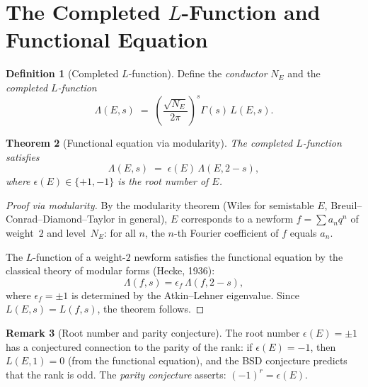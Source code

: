 \documentclass[12pt,a4paper]{amsart}
\newtheorem{theorem}{Theorem}[section]
\theoremstyle{definition}
\newtheorem{definition}[theorem]{Definition}
\newtheorem{remark}[theorem]{Remark}
\begin{document}
\section{The Completed \texorpdfstring{$L$}{L}-Function and Functional Equation}

\begin{definition}[Completed $L$-function]
\label{def:completed_L}
Define the \emph{conductor} $N_E$ and the \emph{completed $L$-function}
\[
  \Lambda(E,s) \;=\; \left(\frac{\sqrt{N_E}}{2\pi}\right)^s
  \Gamma(s)\,L(E,s).
\]
\end{definition}

\begin{theorem}[Functional equation via modularity]
\label{thm:functional_eq}
The completed $L$-function satisfies
\begin{equation}
  \label{eq:functional}
  \Lambda(E,s) \;=\; \epsilon(E)\,\Lambda(E,2-s),
\end{equation}
where $\epsilon(E) \in \{+1,-1\}$ is the \emph{root number} of $E$.
\end{theorem}

\begin{proof}[Proof via modularity]
By the modularity theorem
(Wiles \cite{Wiles1995} for semistable $E$,
Breuil--Conrad--Diamond--Taylor \cite{BCDT2001} in general),
$E$ corresponds to a newform $f = \sum a_n q^n$ of weight~$2$ and level~$N_E$:
for all $n$, the $n$-th Fourier coefficient of $f$ equals $a_n$.

The $L$-function of a weight-$2$ newform satisfies the functional equation
by the classical theory of modular forms (Hecke, 1936):
\[
  \Lambda(f, s) = \epsilon_f\,\Lambda(f, 2-s),
\]
where $\epsilon_f = \pm 1$ is determined by the Atkin--Lehner eigenvalue.
Since $L(E,s) = L(f,s)$, the theorem follows.
\end{proof}

\begin{remark}[Root number and parity conjecture]
The root number $\epsilon(E) = \pm 1$ has a conjectured connection to the
parity of the rank: if $\epsilon(E) = -1$, then $L(E,1) = 0$
(from the functional equation), and the BSD conjecture predicts that
the rank is odd.  The \emph{parity conjecture} asserts:
$(-1)^r = \epsilon(E)$.
\end{remark}

\end{document}
